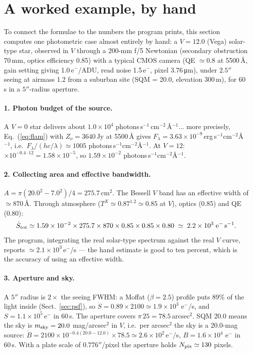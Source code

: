 \section{A worked example, by hand}
\label{sec:example}

To connect the formulae to the numbers the program prints, this section
computes one photometric case almost entirely by hand: a $V = 12.0$
(Vega) solar-type star, observed in $V$ through a 200-mm f/5 Newtonian
(secondary obstruction 70\,mm, optics efficiency 0.85) with a typical
CMOS camera (QE $\simeq 0.8$ at 5500\,\AA{}, gain setting giving
1.0\,e$^-$/ADU, read noise 1.5\,e$^-$, pixel 3.76\,\si{\micro\metre}),
under $2.5''$ seeing at airmass 1.2 from a suburban site
(SQM = 20.0, elevation 300\,m), for 60\,s in a $5''$-radius aperture.

\paragraph{1. Photon budget of the source.} A $V=0$ star delivers about
$1.0\times10^{4}$ photons\,s$^{-1}$\,cm$^{-2}$\,\AA$^{-1}$... more
precisely, Eq.~(\ref{eq:flam}) with $Z_\nu = 3640$\,Jy at 5500\,\AA{}
gives $F_\lambda = 3.63\times10^{-9}$\,erg\,s$^{-1}$cm$^{-2}$\AA$^{-1}$,
i.e.\ $F_\lambda/(hc/\lambda) \simeq 1005$
photons\,s$^{-1}$cm$^{-2}$\AA$^{-1}$. At $V=12$: $\times10^{-0.4\cdot12}
= 1.58\times10^{-5}$, so $1.59\times10^{-2}$
photons\,s$^{-1}$cm$^{-2}$\AA$^{-1}$.

\paragraph{2. Collecting area and effective bandwidth.} $A = \pi(20.0^2 -
7.0^2)/4 = 275.7$\,cm$^2$. The Bessell $V$ band has an effective width
of $\simeq 870$\,\AA{}. Through atmosphere ($T^X \simeq 0.87^{1.2}
\simeq 0.85$ at $V$), optics (0.85) and QE (0.80):
\[
\dot S_{\rm tot} \simeq 1.59\times10^{-2} \times 275.7 \times 870
\times 0.85 \times 0.85 \times 0.80 \;\simeq\; 2.2\times10^{3}\;
\mathrm{e^-\,s^{-1}} .
\]
The program, integrating the real solar-type spectrum against the real
$V$ curve, reports $\simeq 2.1\times10^{3}$\,e$^-$/s --- the hand
estimate is good to ten percent, which is the accuracy of using an
effective width.

\paragraph{3. Aperture and sky.} A $5''$ radius is $2\times$ the seeing
FWHM: a Moffat ($\beta=2.5$) profile puts 89\% of the light inside
(Sect.~\ref{sec:psf}), so $\dot S = 0.89 \times 2100 \simeq 1.9\times10^{3}$
e$^-$/s, and $S = 1.1\times10^{5}$\,e$^-$ in 60\,s. The aperture covers
$\pi\,25 = 78.5$\,arcsec$^2$. SQM 20.0 means the sky is
$m_{\rm sky} = 20.0$ mag/arcsec$^2$ in $V$, i.e.\ per arcsec$^2$ the sky
is a $20.0$-mag source: $\dot B = 2100 \times 10^{-0.4(20.0-12.0)}
\times 78.5 \simeq 2.6\times10^{2}$\,e$^-$/s, $B = 1.6\times10^{4}$
e$^-$ in 60\,s. With a plate scale of $0.776''$/pixel the aperture
holds $N_{\rm pix} \simeq 130$ pixels.

